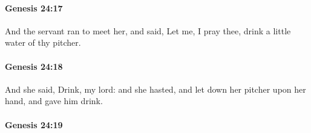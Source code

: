 
		\paragraph{Genesis 24:17} %
			\label{GENESIS-24-17}

			And the servant ran to meet her, and said, Let me, I pray thee, drink a little water of thy pitcher.


		\paragraph{Genesis 24:18} %
			\label{GENESIS-24-18}

			And she said, Drink, my lord: and she hasted, and let down her pitcher upon her hand, and gave him drink.


		\paragraph{Genesis 24:19} %
			\label{GENESIS-24-19}

